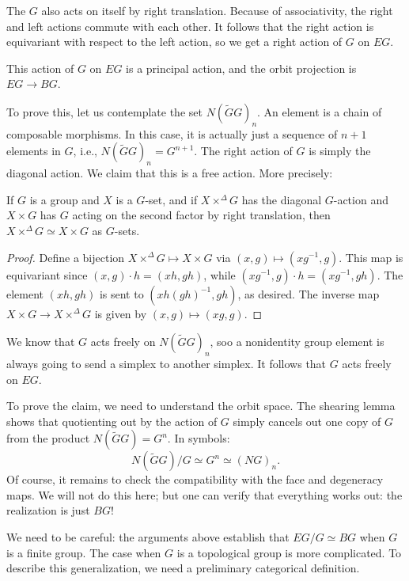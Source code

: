 The $G$ also acts on itself by right translation. Because of associativity, the
right and left actions commute with each other. It follows that the right
action is equivariant with respect to the left action, so we get a right action
of $G$ on $EG$.
\begin{claim}
    This action of $G$ on $EG$ is a principal action, and the orbit projection
    is $EG\to BG$.
\end{claim}
To prove this, let us contemplate the set $N(\widetilde{G}G)_n$. An element is
a chain of composable morphisms. In this case, it is actually just a sequence
of $n+1$ elements in $G$, i.e., $N(\widetilde{G}G)_n = G^{n+1}$. The right
action of $G$ is simply the diagonal action. We claim that this is a free
action. More precisely:
\begin{lemma}[Shearing]
    If $G$ is a group and $X$ is a $G$-set, and if $X\times^\Delta G$ has the
    diagonal $G$-action and $X\times G$ has $G$ acting on the second factor by
    right translation, then $X\times^\Delta G\simeq X\times G$ as $G$-sets.
\end{lemma}
\begin{proof}
    Define a bijection $X\times^\Delta G\mapsto X\times G$ via $(x,g)\mapsto
    (xg^{-1},g)$. This map is equivariant since $(x,g)\cdot h = (xh, gh)$,
    while $(xg^{-1}, g) \cdot h = (xg^{-1}, gh)$. The element $(xh, gh)$ is
    sent to $(xh(gh)^{-1}, gh)$, as desired.
    The inverse map $X\times G\to X\times^\Delta G$ is given by $(x,g)\mapsto
    (xg, g)$.
\end{proof}
We know that $G$ acts freely on $N(\widetilde{G}G)_n$, soo a nonidentity group
element is always going to send a simplex to another simplex. It follows that
$G$ acts freely on $EG$.

To prove the claim, we need to understand the orbit space. The shearing lemma
shows that quotienting out by the action of $G$ simply cancels out one copy of
$G$ from the product $N(\widetilde{G}G) = G^n$. In symbols:
$$N(\widetilde{G} G)/G\simeq G^n\simeq (NG)_n.$$
Of course, it remains to check the compatibility with the face and degeneracy
maps. We will not do this here; but one can verify that everything works out:
the realization is just $BG$!

We need to be careful: the arguments above establish that $EG/G \simeq BG$ when
$G$ is a finite group. The case when $G$ is a topological group is more
complicated. To describe this generalization, we need a preliminary categorical
definition.

